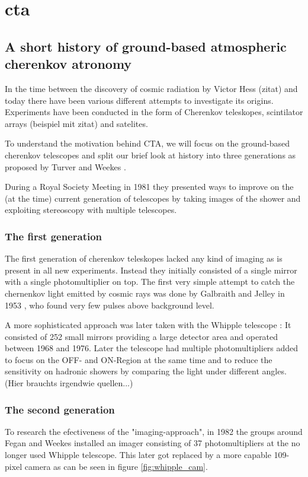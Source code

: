 \chapter{cta}
\label{cta}


\section{A short history of ground-based atmospheric cherenkov atronomy}
In the time between the discovery of cosmic radiation by Victor Hess (zitat)
and today there have been various different attempts to investigate its origins.
Experiments have been conducted in the form of Cherenkov teleskopes, scintilator 
arrays (beispiel mit zitat) and satelites. %

To understand the motivation behind CTA, 
we will focus on the ground-based 
cherenkov telescopes and split our brief look at history 
into three generations as proposed by Turver and Weekes \cite{turver1980}.

During a Royal Society Meeting in 1981 they presented ways to improve on
the (at the time) current generation of telescopes by taking images of the shower
and exploiting stereoscopy with multiple telescopes.

\subsection{The first generation}
The first generation of cherenkov teleskopes 
lacked any kind of imaging as is present in all new experiments.
Instead they initially consisted of a single mirror with a single photomultiplier on top.
The first very simple attempt to catch the chernenkov light emitted by cosmic rays 
was done by Galbraith and Jelley in 1953 \cite{1953Natur.171..349G}, who found very few pulses
above background level.

A more sophisticated approach was later taken with the Whipple telescope \cite{whipple1968}:
It consisted of 252 small mirrors providing a large detector area and operated between 
1968 and 1976.
Later the telescope had multiple photomultipliers added to focus on the OFF- and ON-Region
at the same time and to reduce the sensitivity on hadronic showers by comparing
the light under different angles. (Hier brauchts irgendwie quellen...)

\subsection{The second generation}
To research the efectiveness of the "imaging-approach", in 1982 the groups around Fegan and Weekes
installed an imager consisting of 37 photomultipliers at the no longer used Whipple telescope.
This later got replaced by a more capable 109-pixel camera as can be seen in figure \ref{fig:whipple_cam}.

